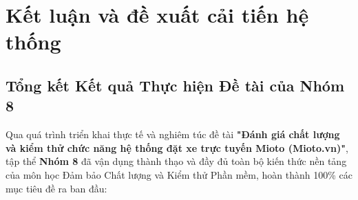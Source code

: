 \documentclass[12pt,a4paper,oneside]{report}
\begin{document}
\chapter{Kết luận và đề xuất cải tiến hệ thống}

\section{Tổng kết Kết quả Thực hiện Đề tài của Nhóm 8}
Qua quá trình triển khai thực tế và nghiêm túc đề tài \textbf{"Đánh giá chất lượng và kiểm thử chức năng hệ thống đặt xe trực tuyến Mioto (Mioto.vn)"}, tập thể \textbf{Nhóm 8} đã vận dụng thành thạo và đầy đủ toàn bộ kiến thức nền tảng của môn học Đảm bảo Chất lượng và Kiểm thử Phần mềm, hoàn thành 100\% các mục tiêu đề ra ban đầu:
\end{document}
